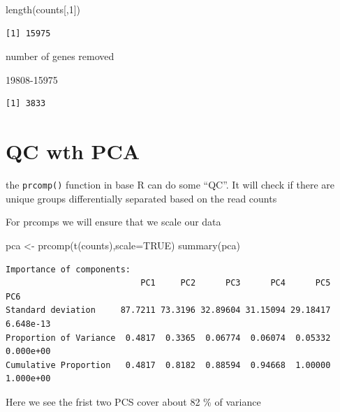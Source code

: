 \documentclass[
  letterpaper,
  DIV=11,
  numbers=noendperiod]{scrartcl}
\newenvironment{Shaded}{\begin{snugshade}}{\end{snugshade}}
\newcommand{\AttributeTok}[1]{\textcolor[rgb]{0.40,0.45,0.13}{#1}}
\newcommand{\ConstantTok}[1]{\textcolor[rgb]{0.56,0.35,0.01}{#1}}
\newcommand{\DecValTok}[1]{\textcolor[rgb]{0.68,0.00,0.00}{#1}}
\newcommand{\FunctionTok}[1]{\textcolor[rgb]{0.28,0.35,0.67}{#1}}
\newcommand{\NormalTok}[1]{\textcolor[rgb]{0.00,0.23,0.31}{#1}}
\newcommand{\OtherTok}[1]{\textcolor[rgb]{0.00,0.23,0.31}{#1}}
\begin{document}
\begin{Shaded}
\begin{Highlighting}[]
\FunctionTok{length}\NormalTok{(counts[,}\DecValTok{1}\NormalTok{])}
\end{Highlighting}
\end{Shaded}

\begin{verbatim}
[1] 15975
\end{verbatim}

number of genes removed

\begin{Shaded}
\begin{Highlighting}[]
\DecValTok{19808{-}15975}
\end{Highlighting}
\end{Shaded}

\begin{verbatim}
[1] 3833
\end{verbatim}

\hypertarget{qc-wth-pca}{%
\section{QC wth PCA}\label{qc-wth-pca}}

the \texttt{prcomp()} function in base R can do some ``QC''. It will
check if there are unique groups differentially separated based on the
read counts

For prcomps we will ensure that we scale our data

\begin{Shaded}
\begin{Highlighting}[]
\NormalTok{pca }\OtherTok{\textless{}{-}} \FunctionTok{prcomp}\NormalTok{(}\FunctionTok{t}\NormalTok{(counts),}\AttributeTok{scale=}\ConstantTok{TRUE}\NormalTok{)}
\FunctionTok{summary}\NormalTok{(pca)}
\end{Highlighting}
\end{Shaded}

\begin{verbatim}
Importance of components:
                           PC1     PC2      PC3      PC4      PC5       PC6
Standard deviation     87.7211 73.3196 32.89604 31.15094 29.18417 6.648e-13
Proportion of Variance  0.4817  0.3365  0.06774  0.06074  0.05332 0.000e+00
Cumulative Proportion   0.4817  0.8182  0.88594  0.94668  1.00000 1.000e+00
\end{verbatim}

Here we see the frist two PCS cover about 82 \% of variance
\end{document}
